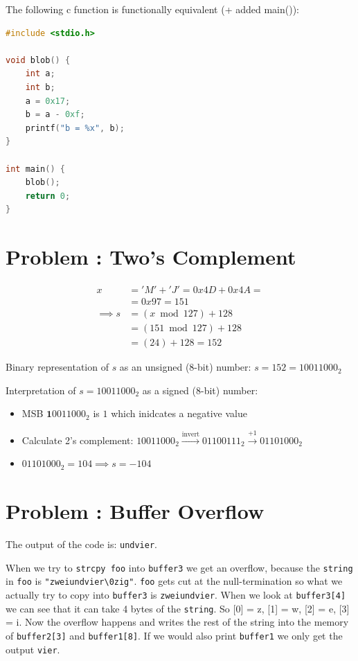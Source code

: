 \documentclass[12pt]{scrartcl}
\newcounter{exnum}
\newcommand{\exercise}[1]{\section*{Problem \theexnum\stepcounter{exnum}: #1}}
\begin{document}
The following c function is functionally equivalent (+ added main()):
\begin{lstlisting}[language={C}]
#include <stdio.h>

void blob() {
    int a;
    int b;
    a = 0x17;
    b = a - 0xf;
    printf("b = %x", b);
}

int main() {
    blob();
    return 0;
}
\end{lstlisting}



\exercise{Two’s Complement}
\begin{align*}
x &= 'M' + 'J' = 0x4D + 0x4A = \\
  &= 0x97 = 151\\
\implies s &= (x \bmod 127) + 128 \\
           &= (151 \bmod 127) + 128 \\
           &= (24) + 128 = 152
\end{align*}

Binary representation of $s$ as an unsigned (8-bit) number: $s = 152 = 10011000_2$

Interpretation of $s = 10011000_2$ as a signed (8-bit) number:
\begin{itemize}
    \item MSB $\mathbf{1}0011000_2$ is $1$ which inidcates a negative value
    \item Calculate 2's complement: $10011000_2 \overset{\text{invert}}{\to} 01100111_2 \overset{+1}{\to} 01101000_2$
    \item $01101000_2 = 104 \implies s = -104$
\end{itemize} 

\exercise{Buffer Overflow}
The output of the code is: \texttt{undvier}.


When we try to \verb|strcpy foo| into \verb|buffer3| we get an overflow, because the \verb|string| in \verb|foo| is \verb|"zweiundvier\0zig"|.
\verb|foo| gets cut at the null-termination so what we actually try to copy into \verb|buffer3| is \texttt{zweiundvier}.
When we look at \verb|buffer3[4]| we can see that it can take 4 bytes of the \verb|string|. 
So [0] = z, [1] = w, [2] = e, [3] = i.
Now the overflow happens and writes the rest of the string into the memory of \verb|buffer2[3]| and \verb|buffer1[8]|.
If we would also print \verb|buffer1| we only get the output \texttt{vier}.
\end{document}
